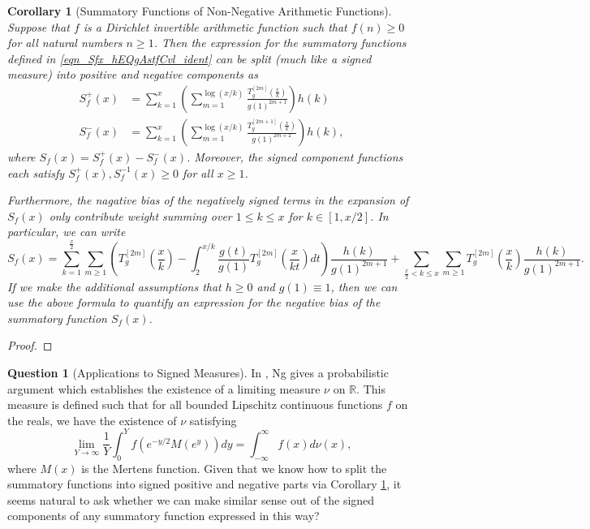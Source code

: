 \documentclass[11pt,reqno]{amsart}
\numberwithin{figure}{section}
\numberwithin{table}{section}
\theoremstyle{plain}
\newtheorem{cor}[theorem]{Corollary}
\numberwithin{theorem}{section}
\theoremstyle{definition}
\newtheorem{question}[theorem]{Question}
\begin{document}
\begin{cor}[Summatory Functions of Non-Negative Arithmetic Functions] 
\label{cor_SummatoryFuncs_NonNegf} 
Suppose that $f$ is a Dirichlet invertible arithmetic function such that $f(n) \geq 0$ for all 
natural numbers $n \geq 1$. Then the expression for the summatory functions defined in 
\eqref{eqn_Sfx_hEQgAstfCvl_ident} can be split (much like a signed measure) 
into positive and negative components as 
\begin{align*} 
S_f^{+}(x) & = \sum_{k=1}^{x} \left(\sum_{m=1}^{\log(x/k)} \frac{T_g^{[2m]}\left(\frac{x}{k}\right)}{ 
     g(1)^{2m+1}}\right) h(k) \\ 
S_f^{-}(x) & = \sum_{k=1}^{x} \left(\sum_{m=1}^{\log(x/k)} \frac{T_g^{[2m+1]}\left(\frac{x}{k}\right)}{ 
     g(1)^{2m+2}}\right) h(k), 
\end{align*} 
where $S_f(x) = S_f^{+}(x) - S_f^{-}(x)$. Moreover, the signed component functions each satisfy 
$S_f^{+}(x), S_f^{-1}(x) \geq 0$ for all $x \geq 1$. 

Furthermore, the nagative bias of the negatively signed terms in the expansion of $S_f(x)$ only 
contribute weight summing over $1 \leq k \leq x$ for $k \in [1, x/2]$. In particular, we can write 
\[
S_f(x) = \sum_{k=1}^{\frac{x}{2}} \sum_{m \geq 1} \left(T_g^{[2m]}\left(\frac{x}{k}\right) - \int_2^{x/k} 
     \frac{g(t)}{g(1)} T_g^{[2m]}\left(\frac{x}{kt}\right) dt\right) \frac{h(k)}{g(1)^{2m+1}} + 
     \sum_{\frac{x}{2} < k \leq x} \sum_{m \geq 1} T_g^{[2m]}\left(\frac{x}{k}\right) \frac{h(k)}{g(1)^{2m+1}}. 
\]
If we make the additional assumptions that $h \geq 0$ and $g(1) \equiv 1$, then we can use the above 
formula to quantify an expression for the negative bias of the summatory function $S_f(x)$. 
\end{cor} 
\begin{proof} 
\end{proof} 

\begin{question}[Applications to Signed Measures]
In \cite{NG-MERTENS}, Ng gives a probabilistic argument which establishes the existence of a 
limiting measure $\nu$ on $\mathbb{R}$. This measure is defined such that for all 
bounded Lipschitz continuous functions $f$ on the reals, we have the existence of $\nu$ 
satisfying 
\[
\lim_{Y \rightarrow \infty} \frac{1}{Y} \int_0^{Y} f\left(e^{-y/2} M(e^y)\right) dy = 
\int_{-\infty}^{\infty} f(x) d\nu(x), 
\]
where $M(x)$ is the Mertens function. Given that we know how to split the summatory functions 
into signed positive and negative parts via Corollary \ref{cor_SummatoryFuncs_NonNegf}, it seems 
natural to ask whether we can make similar sense out of the signed components of any summatory 
function expressed in this way? 
\end{question} 
\end{document}
